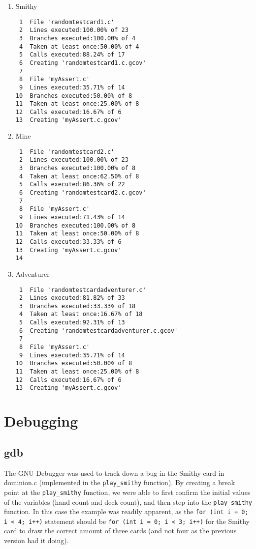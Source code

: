 \documentclass[11pt]{article}
\begin{document}
\begin{enumerate}
\item Smithy
\label{sec:smithy1}
\begin{verbatim}
 1  File 'randomtestcard1.c'
 2  Lines executed:100.00% of 23
 3  Branches executed:100.00% of 4
 4  Taken at least once:50.00% of 4
 5  Calls executed:88.24% of 17
 6  Creating 'randomtestcard1.c.gcov'
 7  
 8  File 'myAssert.c'
 9  Lines executed:35.71% of 14
10  Branches executed:50.00% of 8
11  Taken at least once:25.00% of 8
12  Calls executed:16.67% of 6
13  Creating 'myAssert.c.gcov'
\end{verbatim}

\item Mine
\label{sec:mine1}
\begin{verbatim}
 1  File 'randomtestcard2.c'
 2  Lines executed:100.00% of 23
 3  Branches executed:100.00% of 8
 4  Taken at least once:62.50% of 8
 5  Calls executed:86.36% of 22
 6  Creating 'randomtestcard2.c.gcov'
 7  
 8  File 'myAssert.c'
 9  Lines executed:71.43% of 14
10  Branches executed:100.00% of 8
11  Taken at least once:50.00% of 8
12  Calls executed:33.33% of 6
13  Creating 'myAssert.c.gcov'
14      
\end{verbatim}

\item Adventurer
\label{sec:adventurer1}
\begin{verbatim}
 1  File 'randomtestcardadventurer.c'
 2  Lines executed:81.82% of 33
 3  Branches executed:33.33% of 18
 4  Taken at least once:16.67% of 18
 5  Calls executed:92.31% of 13
 6  Creating 'randomtestcardadventurer.c.gcov'
 7  
 8  File 'myAssert.c'
 9  Lines executed:35.71% of 14
10  Branches executed:50.00% of 8
11  Taken at least once:25.00% of 8
12  Calls executed:16.67% of 6
13  Creating 'myAssert.c.gcov'
\end{verbatim}
\end{enumerate}


\section{Debugging}
\label{sec:debugging}
\subsection{gdb}
\label{sec:gdb}

The GNU Debugger was used to track down a bug in the Smithy card in dominion.c (implemented in the \texttt{play\_smithy} function). By creating a break point at the \texttt{play\_smithy} function, we were able to first confirm the initial values of the variables (hand count and deck count), and then step into the \texttt{play\_smithy} function. In this case the example was readily apparent, as the \texttt{for (int i = 0; i < 4; i++)} statement should be \texttt{for (int i = 0; i < 3; i++)} for the Smithy card to draw the correct amount of three cards (and not four as the previous version had it doing).
\end{document}
